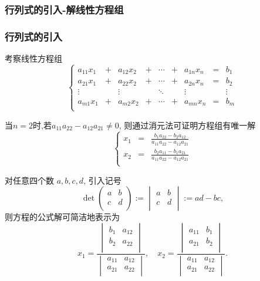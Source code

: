 \subsubsection{行列式的引入-解线性方程组}
\begin{frame}\frametitle{行列式的引入}
考察线性方程组
\begin{equation} \tag{$*$}
\left\{\begin{array}{ccccccccc}
a_{11}x_1& +& a_{12}x_2 & + & \cdots & + & a_{1n}x_n &= & b_1\\
a_{21}x_1& +& a_{22}x_2 & + & \cdots & + & a_{2n}x_n &= & b_2\\
\vdots &&  \vdots &&  \ddots &&  \vdots &&  \vdots \\
a_{m1}x_1& +& a_{m2}x_2 & + & \cdots & + & a_{mn}x_n &= & b_m\\
\end{array}\right.
\end{equation}
\pp
\bigskip

当$n=2$时,若$a_{11}a_{22}-a_{12}a_{21}\neq0$, 则通过消元法可证明方程组有唯一解
\begin{equation*}
\left\{\begin{array}{ccccccccc}
x_1 &=& \frac{b_1a_{22}-b_2a_{12}}{a_{11}a_{22}-a_{12}a_{21}} \\
x_2 &=& \frac{b_2a_{11}-b_1a_{21}}{a_{11}a_{22}-a_{12}a_{21}} \\
\end{array}\right.
\end{equation*}
\pp

对任意四个数 $a,b,c,d$, 引入记号
\[\det\begin{pmatrix}a&b\\c&d\\\end{pmatrix} := \begin{vmatrix}a&b\\c&d\\\end{vmatrix} := ad - bc,\]
则方程的公式解可简洁地表示为
\[x_1 = \frac{\begin{vmatrix}b_1&a_{12}\\b_2&a_{22}\\\end{vmatrix}}{\begin{vmatrix}a_{11}&a_{12}\\a_{21}&a_{22}\\\end{vmatrix}}, \quad x_2 = \frac{\begin{vmatrix}a_{11}&b_{1}\\a_{21}&b_{2}\\\end{vmatrix}}{\begin{vmatrix}a_{11}&a_{12}\\a_{21}&a_{22}\\\end{vmatrix}}.\]
\end{frame}






